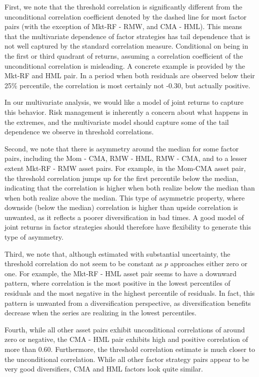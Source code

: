 First, we note that the threshold correlation is significantly different from the unconditional correlation coefficient denoted by the dashed line for most factor pairs (with the exception of Mkt-RF - RMW, and CMA - HML). This means that the multivariate dependence of factor strategies has tail dependence that is not well captured by the standard correlation measure. Conditional on being in the first or third quadrant of returns, assuming a correlation coefficient of the unconditional correlation is misleading. A concrete example is provided by the Mkt-RF and HML pair. In a period when both residuals are observed below their 25\% percentile, the correlation is most certainly not -0.30, but actually positive.

In our multivariate analysis, we would like a model of joint returns to capture this behavior. Risk management is inherently a concern about what happens in the extremes, and the multivariate model should capture some of the tail dependence we observe in threshold correlations.

Second, we note that there is asymmetry around the median for some factor pairs, including the Mom - CMA, RMW - HML, RMW - CMA, and to a lesser extent Mkt-RF - RMW asset pairs. For example, in the Mom-CMA asset pair, the threshold correlation jumps up for the first percentile below the median, indicating that the correlation is higher when both realize below the median than when both realize above the median. This type of asymmetric property, where downside (below the median) correlation is higher than upside correlation is unwanted, as it reflects a poorer diversification in bad times. A good model of joint returns in factor strategies should therefore have flexibility to generate this type of asymmetry.

Third, we note that, although estimated with substantial uncertainty, the threshold correlation do not seem to be constant as $p$ approaches either zero or one. For example, the Mkt-RF - HML asset pair seems to have a downward pattern, where correlation is the most positive in the lowest percentiles of residuals and the most negative in the highest percentile of residuals. In fact, this pattern is unwanted from a diversification perspective, as diversification benefits decrease when the series are realizing in the lowest percentiles.

Fourth, while all other asset pairs exhibit unconditional correlations of around zero or negative, the CMA - HML pair exhibits high and positive correlation of more than 0.60. Furthermore, the threshold correlation estimate is much closer to the unconditional correlation. While all other factor strategy pairs appear to be very good diversifiers, CMA and HML factors look quite similar.

